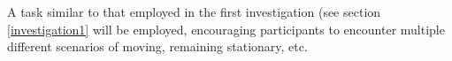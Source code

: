 \documentclass[oneside]{book}
\begin{document}
A task similar to that employed in the first investigation (see section \ref{investigation1} will be employed, encouraging participants to encounter multiple different scenarios of moving, remaining stationary, etc.








\end{document}
